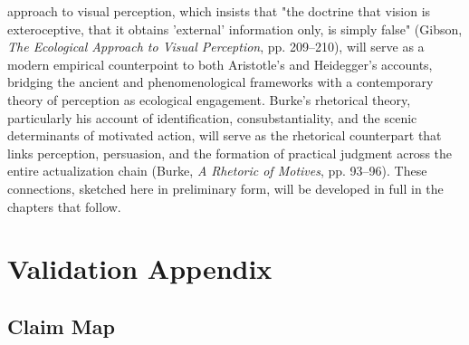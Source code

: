 approach to visual perception, which insists that "the doctrine that vision is exteroceptive, that it obtains 'external' information only, is simply false" (Gibson, \textit{The Ecological Approach to Visual Perception}, pp. 209--210), will serve as a modern empirical counterpoint to both Aristotle's and Heidegger's accounts, bridging the ancient and phenomenological frameworks with a contemporary theory of perception as ecological engagement. Burke's rhetorical theory, particularly his account of identification, consubstantiality, and the scenic determinants of motivated action, will serve as the rhetorical counterpart that links perception, persuasion, and the formation of practical judgment across the entire actualization chain (Burke, \textit{A Rhetoric of Motives}, pp. 93--96). These connections, sketched here in preliminary form, will be developed in full in the chapters that follow. 
\section*{Validation Appendix}


\subsection*{Claim Map}

